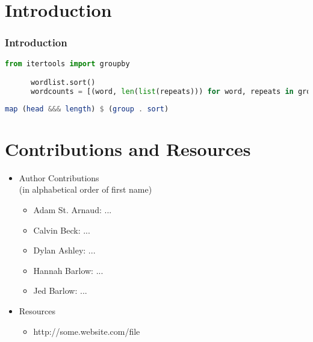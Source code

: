 \documentclass[]{beamer}
\begin{document}
\begin{frame}
\maketitle
\end{frame}

\section{Introduction}
\begin{frame}[fragile]
    \frametitle{Introduction}

    \begin{lstlisting}[frame=single,language=Python,breaklines=true]
      from itertools import groupby

      wordlist.sort()
      wordcounts = [(word, len(list(repeats))) for word, repeats in groupby(wordlist)]
    \end{lstlisting}

    \begin{lstlisting}[frame=single,language=Haskell,breaklines=true]
      map (head &&& length) $ (group . sort)
    \end{lstlisting}
\end{frame}

\section{Contributions and Resources}
\begin{frame}
    \begin{itemize}
        \item Author Contributions\\{\scriptsize(in alphabetical order of first name)}
            \begin{itemize}
                \item Adam St. Arnaud:
                    ...
                \item Calvin Beck:
                    ...
                \item Dylan Ashley:
                    ...
                \item Hannah Barlow:
                    ...
                \item Jed Barlow:
                    ...
            \end{itemize}
        \item Resources
            \begin{itemize}
                \item
                    http://some.website.com/file
            \end{itemize}
    \end{itemize}
\end{frame}
\end{document}
